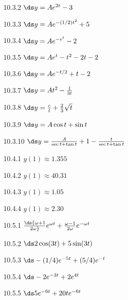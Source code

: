 \begin{Answer}{10.3.2}
 $\ds y=Ae^{2t}-3$
\end{Answer}
\begin{Answer}{10.3.3}
 $\ds y=Ae^{-(1/2)t^2}+5$
\end{Answer}
\begin{Answer}{10.3.4}
 $\ds y=Ae^{-e^t}-2$
\end{Answer}
\begin{Answer}{10.3.5}
 $\ds y=Ae^{t}-t^2-2t-2$
\end{Answer}
\begin{Answer}{10.3.6}
 $\ds y=Ae^{-t/2}+t-2$
\end{Answer}
\begin{Answer}{10.3.7}
 $\ds y=At^2-{1\over3t}$
\end{Answer}
\begin{Answer}{10.3.8}
 $\ds y={c\over t}+{2\over3}\sqrt t$
\end{Answer}
\begin{Answer}{10.3.9}
 $\ds y= A\cos t+\sin t$
\end{Answer}
\begin{Answer}{10.3.10}
 $\ds y= {A\over\sec t+\tan t}+1-{t\over\sec t+\tan t}$
\end{Answer}
\begin{Answer}{10.4.1}
 $y(1)\approx 1.355$
\end{Answer}
\begin{Answer}{10.4.2}
 $y(1)\approx 40.31$
\end{Answer}
\begin{Answer}{10.4.3}
 $y(1)\approx 1.05$
\end{Answer}
\begin{Answer}{10.4.4}
 $y(1)\approx 2.30$
\end{Answer}
\begin{Answer}{10.5.1}
 $\ds {\omega+1\over2\omega}e^{\omega t}+
{\omega-1\over2\omega}e^{-\omega t}$
\end{Answer}
\begin{Answer}{10.5.2}
 $\ds 2\cos(3t)+5\sin(3t)$
\end{Answer}
\begin{Answer}{10.5.3}
 $\ds -(1/4)e^{-5t}+(5/4)e^{-t}$
\end{Answer}
\begin{Answer}{10.5.4}
 $\ds-2e^{-3t}+2e^{4t}$
\end{Answer}
\begin{Answer}{10.5.5}
 $\ds 5e^{-6t}+20te^{-6t}$
\end{Answer}
